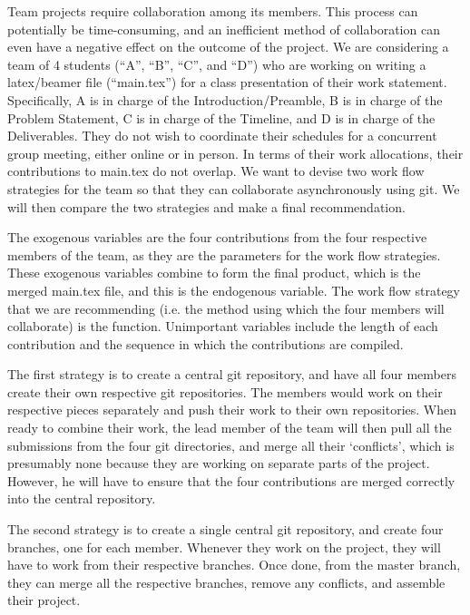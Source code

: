 \documentclass[12pt]{article}
\begin{document}
Team projects require collaboration among its members. This process can potentially be time-consuming, and an inefficient method of collaboration can even have a negative effect on the outcome of the project. We are considering a team of 4 students (“A”, “B”, “C”, and “D”) who are working on writing a latex/beamer file (“main.tex”) for a class presentation of their work statement. Specifically, A is in charge of the Introduction/Preamble, B is in charge of the Problem Statement, C is in charge of the Timeline, and D is in charge of the Deliverables. They do not wish to coordinate their schedules for a concurrent group meeting, either online or in person. In terms of their work allocations, their contributions to main.tex do not overlap. We want to devise two work flow strategies for the team so that they can collaborate asynchronously using git. We will then compare the two strategies and make a final recommendation. 

The exogenous variables are the four contributions from the four respective members of the team, as they are the parameters for the work flow strategies. These exogenous variables combine to form the final product, which is the merged main.tex file, and this is the endogenous variable. The work flow strategy that we are recommending (i.e. the method using which the four members will collaborate) is the function. Unimportant variables include the length of each contribution and the sequence in which the contributions are compiled.

The first strategy is to create a central git repository, and have all four members create their own respective git repositories. The members would work on their respective pieces separately and push their work to their own repositories. When ready to combine their work, the lead member of the team will then pull all the submissions from the four git directories, and merge all their ‘conflicts’, which is presumably none because they are working on separate parts of the project. However, he will have to ensure that the four contributions are merged correctly into the central repository. 

The second strategy is to create a single central git repository, and create four branches, one for each member. Whenever they work on the project, they will have to work from their respective branches. Once done, from the master branch, they can merge all the respective branches, remove any conflicts, and assemble their project. 
\end{document}

